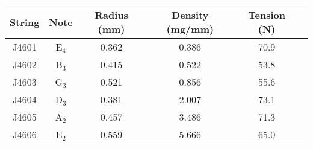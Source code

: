 \begin{tabular}{cccccc}
\toprule
String & Note & Radius (mm) & Density (mg/mm) & Tension (N) \\
\midrule
J4601 & E$_{4}$ & 0.362 & 0.386 & 70.9 \\
J4602 & B$_{3}$ & 0.415 & 0.522 & 53.8 \\
J4603 & G$_{3}$ & 0.521 & 0.856 & 55.6 \\
J4604 & D$_{3}$ & 0.381 & 2.007 & 73.1 \\
J4605 & A$_{2}$ & 0.457 & 3.486 & 71.3 \\
J4606 & E$_{2}$ & 0.559 & 5.666 & 65.0 \\
\bottomrule
\end{tabular}

